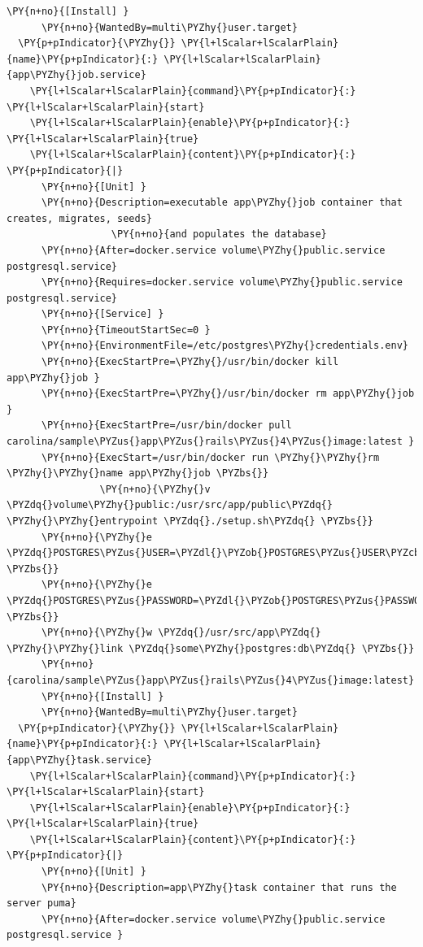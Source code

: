 \begin{codelisting}
\begin{Verbatim}[fontsize=\relsize{-2.5},fontseries=b,commandchars=\\\{\}]
      \PY{n+no}{[Install] }
      \PY{n+no}{WantedBy=multi\PYZhy{}user.target}
  \PY{p+pIndicator}{\PYZhy{}} \PY{l+lScalar+lScalarPlain}{name}\PY{p+pIndicator}{:} \PY{l+lScalar+lScalarPlain}{app\PYZhy{}job.service}
    \PY{l+lScalar+lScalarPlain}{command}\PY{p+pIndicator}{:} \PY{l+lScalar+lScalarPlain}{start}
    \PY{l+lScalar+lScalarPlain}{enable}\PY{p+pIndicator}{:} \PY{l+lScalar+lScalarPlain}{true}
    \PY{l+lScalar+lScalarPlain}{content}\PY{p+pIndicator}{:} \PY{p+pIndicator}{|}
      \PY{n+no}{[Unit] }
      \PY{n+no}{Description=executable app\PYZhy{}job container that creates, migrates, seeds}
                  \PY{n+no}{and populates the database}
      \PY{n+no}{After=docker.service volume\PYZhy{}public.service postgresql.service}
      \PY{n+no}{Requires=docker.service volume\PYZhy{}public.service postgresql.service}
      \PY{n+no}{[Service] }
      \PY{n+no}{TimeoutStartSec=0 }
      \PY{n+no}{EnvironmentFile=/etc/postgres\PYZhy{}credentials.env}
      \PY{n+no}{ExecStartPre=\PYZhy{}/usr/bin/docker kill app\PYZhy{}job }
      \PY{n+no}{ExecStartPre=\PYZhy{}/usr/bin/docker rm app\PYZhy{}job }
      \PY{n+no}{ExecStartPre=/usr/bin/docker pull carolina/sample\PYZus{}app\PYZus{}rails\PYZus{}4\PYZus{}image:latest }
      \PY{n+no}{ExecStart=/usr/bin/docker run \PYZhy{}\PYZhy{}rm \PYZhy{}\PYZhy{}name app\PYZhy{}job \PYZbs{}}
                \PY{n+no}{\PYZhy{}v \PYZdq{}volume\PYZhy{}public:/usr/src/app/public\PYZdq{} \PYZhy{}\PYZhy{}entrypoint \PYZdq{}./setup.sh\PYZdq{} \PYZbs{}}
      \PY{n+no}{\PYZhy{}e \PYZdq{}POSTGRES\PYZus{}USER=\PYZdl{}\PYZob{}POSTGRES\PYZus{}USER\PYZcb{}\PYZdq{} \PYZbs{}}
      \PY{n+no}{\PYZhy{}e \PYZdq{}POSTGRES\PYZus{}PASSWORD=\PYZdl{}\PYZob{}POSTGRES\PYZus{}PASSWORD\PYZcb{}\PYZdq{} \PYZbs{}}
      \PY{n+no}{\PYZhy{}w \PYZdq{}/usr/src/app\PYZdq{} \PYZhy{}\PYZhy{}link \PYZdq{}some\PYZhy{}postgres:db\PYZdq{} \PYZbs{}}
      \PY{n+no}{carolina/sample\PYZus{}app\PYZus{}rails\PYZus{}4\PYZus{}image:latest}
      \PY{n+no}{[Install] }
      \PY{n+no}{WantedBy=multi\PYZhy{}user.target}
  \PY{p+pIndicator}{\PYZhy{}} \PY{l+lScalar+lScalarPlain}{name}\PY{p+pIndicator}{:} \PY{l+lScalar+lScalarPlain}{app\PYZhy{}task.service}
    \PY{l+lScalar+lScalarPlain}{command}\PY{p+pIndicator}{:} \PY{l+lScalar+lScalarPlain}{start}
    \PY{l+lScalar+lScalarPlain}{enable}\PY{p+pIndicator}{:} \PY{l+lScalar+lScalarPlain}{true}
    \PY{l+lScalar+lScalarPlain}{content}\PY{p+pIndicator}{:} \PY{p+pIndicator}{|}
      \PY{n+no}{[Unit] }
      \PY{n+no}{Description=app\PYZhy{}task container that runs the server puma}
      \PY{n+no}{After=docker.service volume\PYZhy{}public.service postgresql.service }

\end{Verbatim}
\end{codelisting}
